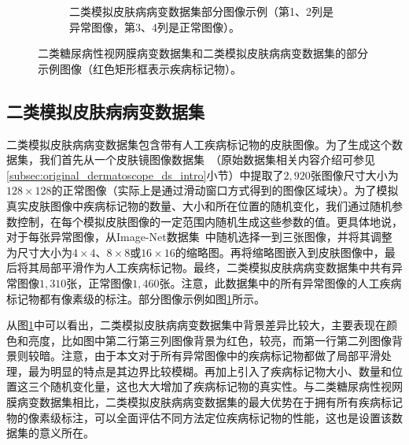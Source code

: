 \begin{figure}[h!]
\begin{subfigure}{0.48\textwidth}
		\caption{二类模拟皮肤病病变数据集部分图像示例（第1、2列是异常图像，第3、4列是正常图像）。}
		\label{subfig:bin_simulate_skin_example}
	\end{subfigure}
	\caption[本章实验数据集部分示例图像]{二类糖尿病性视网膜病变数据集和二类模拟皮肤病病变数据集的部分示例图像（红色矩形框表示疾病标记物）。}
	\label{mul_fig:bin_ds_example}
\end{figure}
\subsection{二类模拟皮肤病病变数据集}\label{subsec:bin_simulated_skin_ds}
二类模拟皮肤病病变数据集包含带有人工疾病标记物的皮肤图像。为了生成这个数据集，我们首先从一个皮肤镜图像数据集~\cite{codella2018skin}（原始数据集相关内容介绍可参见\ref{subsec:original_dermatoscope_ds_intro}小节）中提取了$2,920$张图像尺寸大小为$128\times128$的正常图像（实际上是通过滑动窗口方式得到的图像区域块）。为了模拟真实皮肤图像中疾病标记物的数量、大小和所在位置的随机变化，我们通过随机参数控制，在每个模拟皮肤图像的一定范围内随机生成这些参数的值。更具体地说，对于每张异常图像，从Image-Net数据集~\cite{deng2009imagenet}中随机选择一到三张图像，并将其调整为尺寸大小为$4\times 4$、$8\times 8$或$16\times 16$的缩略图。再将缩略图嵌入到皮肤图像中，最后将其局部平滑作为人工疾病标记物。最终，二类模拟皮肤病病变数据集中共有异常图像$1,310$张，正常图像$1,460$张。注意，此数据集中的所有异常图像的人工疾病标记物都有像素级的标注。部分图像示例如图\ref{subfig:bin_simulate_skin_example}所示。

从图\ref{subfig:bin_simulate_skin_example}中可以看出，二类模拟皮肤病病变数据集中背景差异比较大，主要表现在颜色和亮度，比如图中第二行第三列图像背景为红色，较亮，而第一行第二列图像背景则较暗。注意，由于本文对于所有异常图像中的疾病标记物都做了局部平滑处理，最为明显的特点是其边界比较模糊。再加上引入了疾病标记物大小、数量和位置这三个随机变化量，这也大大增加了疾病标记物的真实性。与二类糖尿病性视网膜病变数据集相比，二类模拟皮肤病病变数据集的最大优势在于拥有所有疾病标记物的像素级标注，可以全面评估不同方法定位疾病标记物的性能，这也是设置该数据集的意义所在。
